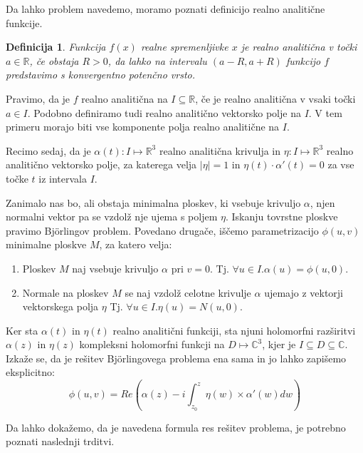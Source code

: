 \documentclass{article}
\newtheorem{definicija}{Definicija}
\begin{document}
    Da lahko problem navedemo, moramo poznati definicijo realno analitične funkcije.

    \begin{definicija}
        Funkcija $f(x)$ realne spremenljivke $x$ je \emph{realno analitična} v točki $a\in\mathbb{R}$, 
        če obstaja $R>0$, da lahko na intervalu $(a-R,a+R)$ funkcijo $f$ predstavimo s konvergentno potenčno vrsto.
    \end{definicija}
    
    Pravimo, da je $f$ realno analitična na $I\subseteq \mathbb{R}$, če je realno analitična v vsaki točki $a\in I$. 
    Podobno definiramo tudi realno analitično vektorsko polje na $I$. V tem primeru morajo biti vse komponente polja 
    realno analitične na $I$. 
    
    Recimo sedaj, da je $\alpha (t) : I \mapsto \mathbb{R}^3$ realno analitična krivulja in $\eta : I \mapsto \mathbb{R}^3$ 
    realno analitično vektorsko polje, za katerega velja $ \left\lvert \eta \right\rvert = 1$ in $\eta (t) \cdot \alpha' (t) = 0$ 
    za vse točke $t$ iz intervala $I$. 

    Zanimalo nas bo, ali obstaja minimalna ploskev, ki vsebuje krivuljo $\alpha$, njen normalni vektor pa se vzdolž nje 
    ujema s poljem $\eta$. Iskanju tovrstne ploskve pravimo Björlingov problem. Povedano drugače, iščemo parametrizacijo 
    $\phi (u, v)$ minimalne ploskve $M$, za katero velja:
    \begin{enumerate}
        \item Ploskev $M$ naj vsebuje krivuljo $\alpha$ pri $v = 0$. Tj. $\forall u \in I. \alpha (u) = \phi (u, 0)$.
        \item Normale na ploskev $M$ se naj vzdolž celotne krivulje $\alpha$ ujemajo z vektorji vektorskega polja $\eta$ 
        Tj. $\forall u \in I. \eta (u) = N(u, 0)$.
    \end{enumerate}

    Ker sta $\alpha(t)$ in $\eta(t)$ realno analitični funkciji, sta njuni holomorfni razširitvi $\alpha(z)$ 
    in $\eta(z)$ kompleksni holomorfni funkcji na $D \mapsto \mathbb{C}^3$, kjer je $I \subseteq D \subseteq \mathbb{C}$.
    Izkaže se, da je rešitev Björlingovega problema ena sama in jo lahko zapišemo eksplicitno:
    $$ \phi (u, v) = Re \left( \alpha (z) - i \int_{z_0}^{z} \eta (w) \times \alpha' (w) dw \right) $$


    Da lahko dokažemo, da je navedena formula res rešitev problema, je potrebno poznati naslednji trditvi.
\end{document}
